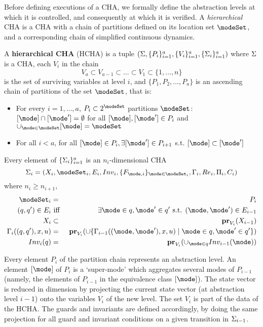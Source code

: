 Before defining executions of a CHA, we formally define the abstraction levels at which it is controlled, and consequently at which it is verified.
A \emph{hierarchical} CHA is a CHA with a chain of partitions defined on its location set $\modeSet$, and a corresponding chain of simplified continuous dynamics.
\begin{defn}
	A \textbf{hierarchical CHA} (HCHA) is a tuple 
	$(\Sigma, \{P_i\}_{i=1}^{a}, \{V_i\}_{i=1}^{a}, \{\Sigma_i\}_{i=1}^{a})$ where 
	$\Sigma$ is a CHA, 
	each $V_i$ in the chain 
	\[V_a \subset V_{a-1} \subset \ldots \subset V_1 \subset \{1,\ldots,n\}\]
	is the set of surviving variables at level $i$, and 
	$\{P_1,P_2,\ldots,P_a\}$ is an ascending chain of partitions of the set $\modeSet$, that is:
	\begin{itemize}
		\item For every $i =1,\ldots,a$, $P_i \subset 2^\modeSet$ partitions $\modeSet$: $[\mode] \cap [\mode'] = \emptyset$ for all $[\mode],[\mode'] \in P_i$ and $\cup_{\mode\in \modeSet}[\mode] = \modeSet$
		\item For all $i<a$, for all $[\mode]\in P_i, \exists [\mode'] \in P_{i+1}$ s.t. $[\mode] \subset [\mode']$ 
	\end{itemize}
	Every element of $\{\Sigma_i\}_{i=1}^{a}$ is an $n_i$-dimensional CHA 
	\[\Sys_i = (\stSet_i, \modeSet_i, E_i, Inv_i, \{F_{\mode,i}\}_{\mode \in \modeSet_i}, \guard_i, \reset_i, \funcOut_i, C_i)\]
	where  $n_i \geq n_{i+1}$,
	\begin{eqnarray*}
		\modeSet_i &=& P_i
		\\
		(q,q') \in E_i &\text{ iff }& \exists \mode \in q, \mode' \in q' \text{ s.t. } (\mode,\mode') \in E_{i-1}		
		\\
		\stSet_i &\subset& \proj{\stSet_{i-1}}{V_i} 
		\\
		\guard_i((q,q'),x,u) &=& \proj{\cup \{\guard_{i-1}((\mode,\mode'),x,u) \sut \mode \in q, \mode' \in q'\}}{V_i}
		\\
		Inv_i(q) &=& \proj{ \cup_{\mode \in q}Inv_{i-1}(\mode)}{V_i}
	\end{eqnarray*}
	
\end{defn}

Every element $P_i$ of the partition chain represents an abstraction level. 
An element $[\mode]$ of $P_i$ is a `super-mode' which aggregates several modes of $P_{i-1}$ (namely, the elements of $P_{i-1}$ in the equivalence class $[\mode]$).
The state vector is reduced in dimension by projecting the current state vector (at abstraction level $i-1$) onto the variables $V_i$ of the new level. 
The set $V_i$ is part of the data of the HCHA.
The guards and invariants are defined accordingly, by doing the same projection for all guard and invariant conditions on a given transition in $\Sigma_{i-1}$.

